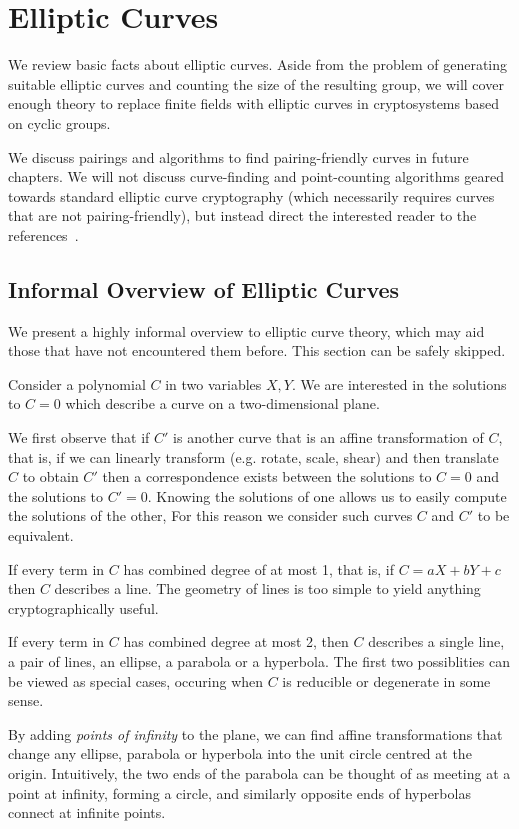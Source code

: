 \chapter {Elliptic Curves}

We review basic facts about elliptic curves.
Aside from the problem of generating suitable elliptic curves
and counting the size of the resulting group,
we will cover enough theory to replace finite fields with
elliptic curves in cryptosystems based on cyclic groups.

We discuss pairings and algorithms to find pairing-friendly curves
in future chapters. We will not
discuss curve-finding and point-counting algorithms geared
towards standard elliptic curve cryptography (which necessarily requires
curves that are not pairing-friendly), but instead direct
the interested reader to the references~\cite{bss}.

\section {Informal Overview of Elliptic Curves}

We present a highly informal overview to elliptic curve theory,
which may aid those that have not encountered them before.
This section can be safely skipped.

Consider a polynomial $C$ in two variables $X, Y$.
We are interested in the solutions to $C = 0$
which describe a curve on a two-dimensional plane.

We first observe that if $C'$ is another curve that is an affine transformation
of $C$, that is, if we can linearly transform (e.g. rotate, scale, shear)
and then translate $C$ to
obtain $C'$ then a correspondence exists between
the solutions to $C = 0$ and the solutions to $C' = 0$. Knowing
the solutions of one allows us to easily compute the solutions of the other,
For this reason we consider such curves $C$ and $C'$ to be equivalent.

If every term in $C$ has combined degree of at most 1, that is,
if $C = a X + b Y + c$ then $C$ describes a line. The geometry of lines
is too simple to yield anything cryptographically useful.

If every term in $C$ has combined degree at most 2, then $C$ describes
a single line, a pair of lines, an ellipse, a parabola or a hyperbola.
The first two possiblities can be viewed as special cases, occuring
when $C$ is reducible or degenerate in some sense.

By adding \emph{points of infinity} to the plane, we can find affine
transformations that change any ellipse, parabola or hyperbola into the
unit circle centred at the origin. Intuitively, the two ends of the parabola
can be thought of as meeting
at a point at infinity, forming a circle,
and similarly opposite ends of hyperbolas connect at infinite points.

